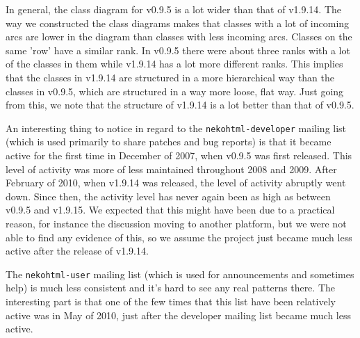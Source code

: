 In general, the class diagram for v0.9.5 is a lot wider than that of v1.9.14.
The way we constructed the class diagrams makes that classes with a lot of incoming arcs are lower in the diagram than classes with less incoming arcs.
Classes on the same 'row' have a similar rank.
In v0.9.5 there were about three ranks with a lot of the classes in them while v1.9.14 has a lot more different ranks.
This implies that the classes in v1.9.14 are structured in a more hierarchical way than the classes in v0.9.5, which are structured in a way more loose, flat way.
Just going from this, we note that the structure of v1.9.14 is a lot better than that of v0.9.5.

An interesting thing to notice in regard to the \texttt{nekohtml-developer} mailing list (which is used primarily to share patches and bug reports) is that it became active for the first time in December of 2007, when v0.9.5 was first released.
This level of activity was more of less maintained throughout 2008 and 2009.
After February of 2010, when v1.9.14 was released, the level of activity abruptly went down.
Since then, the activity level has never again been as high as between v0.9.5 and v1.9.15.
We expected that this might have been due to a practical reason, for instance the discussion moving to another platform, but we were not able to find any evidence of this, so we assume the project just became much less active after the release of v1.9.14.

The \texttt{nekohtml-user} mailing list (which is used for announcements and sometimes help) is much less consistent and it's hard to see any real patterns there.
The interesting part is that one of the few times that this list have been relatively active was in May of 2010, just after the developer mailing list became much less active.
